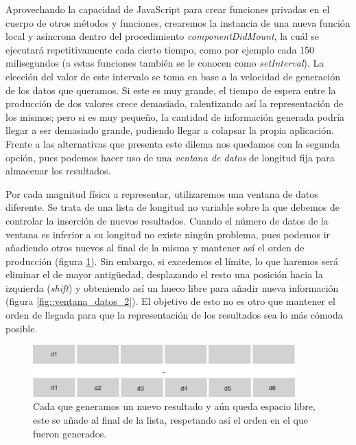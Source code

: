 \documentclass[../main.tex]{subfiles}
\begin{document}
Aprovechando la capacidad de JavaScript para crear funciones privadas en el cuerpo de otros métodos y funciones, crearemos la instancia de una nueva función local y asíncrona dentro del procedimiento \textit{componentDidMount}, la cuál se ejecutará repetitivamente cada cierto tiempo, como por ejemplo cada 150 milisegundos (a estas funciones también se le conocen como \textit{setInterval}). La elección del valor de este intervalo se toma en base a la velocidad de generación de los datos que queramos. Si este es muy grande, el tiempo de espera entre la producción de dos valores crece demasiado, ralentizando así la representación de los mismos; pero si es muy pequeño, la cantidad de información generada podría llegar a ser demasiado grande, pudiendo llegar a colapsar la propia aplicación. Frente a las alternativas que presenta este dilema nos quedamos con la segunda opción, pues podemos hacer uso de una \textit{ventana de datos} de longitud fija para almacenar los resultados.

Por cada magnitud física a representar, utilizaremos una ventana de datos diferente. Se trata de una lista de longitud no variable sobre la que debemos de controlar la inserción de nuevos resultados. Cuando el número de datos de la ventana es inferior a su longitud no existe ningún problema, pues podemos ir añadiendo otros  nuevos al final de la misma y mantener así el orden de producción (figura \ref{fig::ventana_datos_1}). Sin embargo, si excedemos el límite, lo que haremos será eliminar el de mayor antigüedad, desplazando el resto una posición hacia la izquierda (\textit{shift}) y obteniendo así un hueco libre para añadir nueva información (figura \ref{fig::ventana_datos_2}). El objetivo de esto no es otro que mantener el orden de llegada para que la representación de los resultados sea lo más cómoda posible. \\


\begin{figure}[!h]
    \centering
    \includegraphics[width=0.9\textwidth]{images/ventana_datos_1.png}
    \caption{Cada que generamos un nuevo resultado y aún queda espacio libre, este se añade al final de la lista, respetando así el orden en el que fueron generados.}
    \label{fig::ventana_datos_1}
\end{figure}
\end{document}
